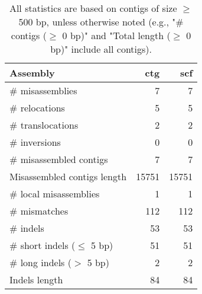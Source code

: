 \documentclass[12pt,a4paper]{article}
\begin{document}
\begin{table}[ht]
\begin{center}
\caption{All statistics are based on contigs of size $\geq$ 500 bp, unless otherwise noted (e.g., "\# contigs ($\geq$ 0 bp)" and "Total length ($\geq$ 0 bp)" include all contigs).}
\begin{tabular}{|l*{2}{|r}|}
\hline
Assembly & ctg & scf \\ \hline
\# misassemblies & 7 & 7 \\ \hline
\hspace{5mm}\# relocations & 5 & 5 \\ \hline
\hspace{5mm}\# translocations & 2 & 2 \\ \hline
\hspace{5mm}\# inversions & 0 & 0 \\ \hline
\# misassembled contigs & 7 & 7 \\ \hline
Misassembled contigs length & 15751 & 15751 \\ \hline
\# local misassemblies & 1 & 1 \\ \hline
\# mismatches & 112 & 112 \\ \hline
\# indels & 53 & 53 \\ \hline
\hspace{5mm}\# short indels ($\leq$ 5 bp) & 51 & 51 \\ \hline
\hspace{5mm}\# long indels ($>$ 5 bp) & 2 & 2 \\ \hline
Indels length & 84 & 84 \\ \hline
\end{tabular}
\end{center}
\end{table}
\end{document}
